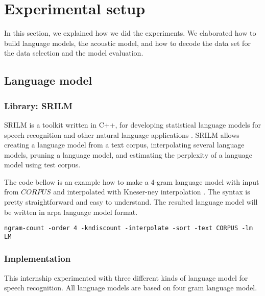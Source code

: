 
\section{Experimental setup}
In this section, we explained how we did the experiments. We elaborated how to build language models,   the acoustic model, and  how to decode the data set for the data selection and the model evaluation.

\subsection{Language model}
\subsubsection{Library: SRILM}
SRILM is a toolkit  written in C++, for developing statistical language models for speech recognition and other natural language applications \cite{Stolcke02srilm}. SRILM allows creating a language model from a text corpus, interpolating several language models, pruning a language model, and estimating the perplexity of a language model using  test corpus. 

The code bellow is an example how to make a 4-gram language model with input from $CORPUS$ and interpolated with Kneser-ney interpolation \cite{KneserNey1993}. The syntax is pretty straightforward and easy to understand. The resulted language model will be written in arpa language model format.
\begin{verbatim}
ngram-count -order 4 -kndiscount -interpolate -sort -text CORPUS -lm LM
\end{verbatim}

\subsubsection{Implementation}
\label{3LM}
This internship experimented with three different kinds of language model for speech recognition. All language models are based on four gram language model. 

